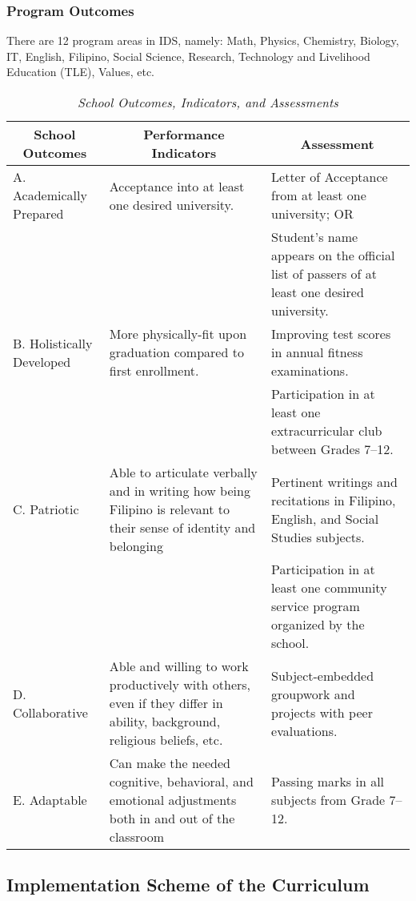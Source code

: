 \subsubsection{Program Outcomes}
There are 12 program areas in IDS, namely: Math, Physics, Chemistry, Biology, IT, English, Filipino, Social Science, Research, Technology and Livelihood Education (TLE), Values, etc.


\vspace{1em}
\begin{table}
\small
\renewcommand{\arraystretch}{1.6}
\begin{tabularx}{\textwidth}{X p{5.7cm} p{6cm}}

\multicolumn{1}{c}{\textbf{School Outcomes}} &	\multicolumn{1}{c}{\textbf{Performance Indicators}} & \multicolumn{1}{c}{\textbf{Assessment}}\\
\toprule
A. Academically Prepared & Acceptance into at least one desired university. & Letter of Acceptance from at least one university; OR\\

& & Student's name appears on the official list of passers of at least one desired university.\\
\midrule
B. Holistically Developed	& More physically-fit upon graduation compared to first enrollment. & Improving test scores in annual fitness examinations.\\

& & Participation in at least one extracurricular club between Grades 7--12.\\
\midrule
C. Patriotic	&	Able to articulate verbally and in writing how being Filipino is relevant to their sense of identity and belonging & Pertinent writings and recitations in Filipino, English, and Social Studies subjects.\\

& & Participation in at least one community service program organized by the school.\\
\midrule
D. Collaborative & Able and willing to work productively with others, even if they differ in ability, background, religious beliefs, etc. & Subject-embedded groupwork and projects with peer evaluations.\\
\midrule
E. Adaptable & Can make the needed cognitive, behavioral, and emotional adjustments both in and out of the classroom & Passing marks in all subjects from Grade 7--12.\\
\bottomrule
\end{tabularx} 
\caption{\textit{School Outcomes, Indicators, and Assessments}}
\label{table:1}
\end{table}

\subsection{Implementation Scheme of the Curriculum}




